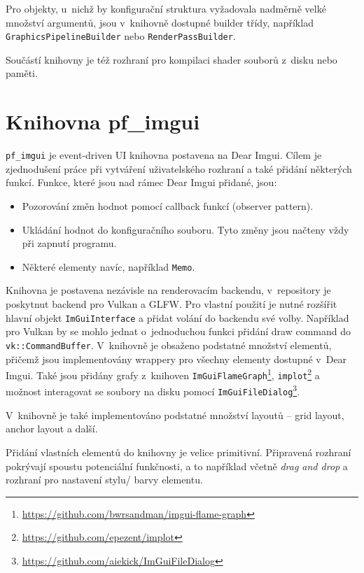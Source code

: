 Pro objekty, u~nichž by konfigurační struktura vyžadovala nadměrně velké množství argumentů, jsou v~knihovně dostupné builder třídy, například \texttt{GraphicsPipelineBuilder} nebo \texttt{RenderPassBuilder}.

Součástí knihovny je též rozhraní pro kompilaci shader souborů z~disku nebo paměti.



\section{Knihovna pf\_imgui}\label{sec:pf_imgui}
\texttt{pf\_imgui} je event-driven UI knihovna postavena na Dear Imgui. Cílem je zjednodušení práce při vytváření uživatelského rozhraní a také přidání některých funkcí. Funkce, které jsou nad rámec Dear Imgui přidané, jsou:

\begin{itemize}
	\item Pozorování změn hodnot pomocí callback funkcí (observer pattern).
	\item Ukládání hodnot do konfiguračního souboru. Tyto změny jsou načteny vždy při zapnutí programu.
	\item Některé elementy navíc, například \texttt{Memo}.
\end{itemize}

Knihovna je postavena nezávisle na renderovacím backendu, v~repository je poskytnut backend pro Vulkan a GLFW. Pro vlastní použití je nutné rozšířit hlavní objekt \texttt{ImGuiInterface} a přidat volání do backendu své volby. Například pro Vulkan by se mohlo jednat o~jednoduchou funkci přidání draw command do \texttt{vk::CommandBuffer}. V~knihovně je obsaženo podstatné množství elementů, přičemž jsou implementovány wrappery pro všechny elementy dostupné v~Dear Imgui. Také jsou přidány grafy z~knihoven \texttt{ImGuiFlameGraph}\footnote{\url{https://github.com/bwrsandman/imgui-flame-graph}}, \texttt{implot}\footnote{\url{https://github.com/epezent/implot}} a možnost interagovat se soubory na disku pomocí \texttt{ImGuiFileDialog}\footnote{\url{https://github.com/aiekick/ImGuiFileDialog}}.

V~knihovně je také implementováno podstatné množství layoutů -- grid layout, anchor layout a další.

Přidání vlastních elementů do knihovny je velice primitivní. Připravená rozhraní pokrývají spoustu potenciální funkčnosti, a to například včetně \textit{drag and drop} a rozhraní pro nastavení stylu/ barvy elementu. 


